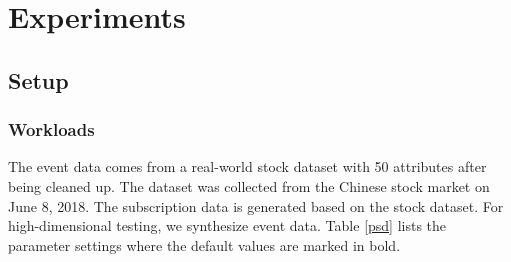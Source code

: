 \documentclass[runningheads]{llncs}
\begin{document}

\section{Experiments}
\label{ex}

\subsection{Setup}

\subsubsection{Workloads}
The event data comes from a real-world stock dataset with 50 attributes after being cleaned up. The dataset was collected from the Chinese stock market on June 8, 2018. The subscription data is generated based on the stock dataset. For high-dimensional testing, we synthesize event data.
Table \ref{psd} lists the parameter settings where the default values are marked in bold. 

\end{document}
